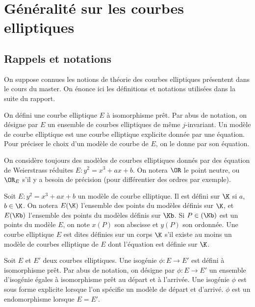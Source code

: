 \section{Généralité sur les courbes elliptiques}

\subsection{Rappels et notations}

On suppose connues les notions de théorie des courbes elliptiques présentent dans le cours du master. On énonce ici les définitions et notations utilisées dans la suite du rapport. 


\begin{Def}
	On défini une courbe elliptique $E$ à isomorphisme prêt. Par abus de notation, on désigne par $E$ un ensemble de courbes elliptiques de même $j$-invariant. Un modèle de courbe elliptique est une courbe elliptique explicite donnée par une équation. Pour préciser le choix d'un modèle de courbe de $E$, on le donne par son équation. 
\end{Def}

\begin{Rem}
	On considère toujours des modèles de courbes elliptiques donnés par des équation de Weierstrass réduites $E : y^2 = x^3 + ax + b$. On notera $\OR$ le point neutre, ou $\OR_{E}$ s'il y a besoin de précision (pour différentier des ordres par exemple). 
\end{Rem}

\begin{Def}
	Soit $E : y^2 = x^3 + ax + b$ un modèle de courbe elliptique. Il est défini sur $\K$ si $a$, $b\in\K$. On notera $E(\K)$ l'ensemble des points du modèles définis sur $\K$, et $E(\Kb)$ l'ensemble des points du modèles définis sur $\Kb$. Si $P\in(\Kb)$ est un points du modèle $E$, on note $x(P)$ son abscisse et $y(P)$ son ordonnée. Une courbe elliptique $E$ est dites définies sur un corps $\K$ s'il existe au moins un modèle de courbes elliptique de $E$ dont l'équation est définie sur $\K$.
\end{Def}


\begin{Def}
	Soit $E$ et $E'$ deux courbes elliptiques. Une isogénie $\phi : E\rightarrow E'$ est défini à isomorphisme prêt. Par abus de notation, on désigne par $\phi : E\rightarrow E'$ un ensemble d'isogénie égales à isomorphisme prêt au départ et à l'arrivée. Une isogénie $\phi$ est sous forme explicite lorsque l'on spécifie un modèle de départ et d'arrivé. $\phi$ est un endomorphisme lorsque $E = E'$. 
\end{Def}

